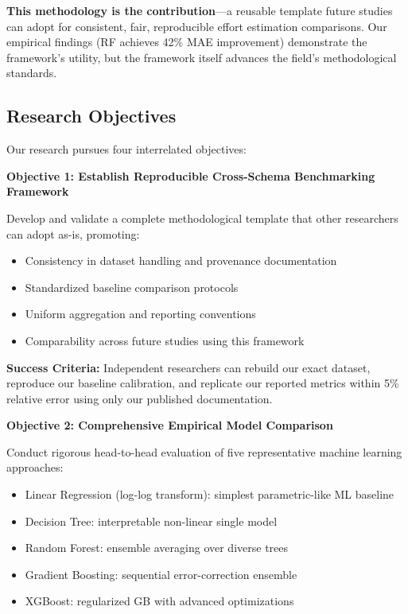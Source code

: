 \documentclass[11pt,a4paper]{article}
\begin{document}
\textbf{This methodology is the contribution}---a reusable template future studies can adopt for consistent, fair, reproducible effort estimation comparisons. Our empirical findings (RF achieves 42\% MAE improvement) demonstrate the framework's utility, but the framework itself advances the field's methodological standards.

\subsection{Research Objectives}

Our research pursues four interrelated objectives:

\textbf{Objective 1: Establish Reproducible Cross-Schema Benchmarking Framework}

Develop and validate a complete methodological template that other researchers can adopt as-is, promoting:
\begin{itemize}
    \item Consistency in dataset handling and provenance documentation
    \item Standardized baseline comparison protocols
    \item Uniform aggregation and reporting conventions
    \item Comparability across future studies using this framework
\end{itemize}

\textbf{Success Criteria:} Independent researchers can rebuild our exact dataset, reproduce our baseline calibration, and replicate our reported metrics within 5\% relative error using only our published documentation.

\textbf{Objective 2: Comprehensive Empirical Model Comparison}

Conduct rigorous head-to-head evaluation of five representative machine learning approaches:
\begin{itemize}
    \item Linear Regression (log-log transform): simplest parametric-like ML baseline
    \item Decision Tree: interpretable non-linear single model
    \item Random Forest: ensemble averaging over diverse trees
    \item Gradient Boosting: sequential error-correction ensemble
    \item XGBoost: regularized GB with advanced optimizations
\end{itemize}
\end{document}
